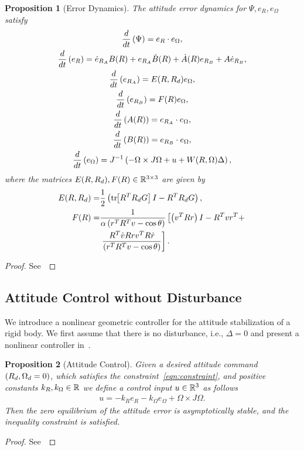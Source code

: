 \documentclass[fleqn]{IJCAS}  %
\newtheorem{prop}{Proposition}
\begin{document}
\begin{multicols}{2}
\begin{prop}[Error Dynamics]\label{prop:error_dyn}
	The attitude error dynamics for \( \Psi, e_R, e_\Omega \) satisfy 
	\begin{gather}
		\frac{d }{d t} \left( \Psi \right) = e_R \cdot e_\Omega , \label{eqn:psi_dot}\\
		\frac{d }{d t} \left( e_R \right) = \dot{e}_{R_A} B(R) + e_{R_A} \dot{B}(R) + \dot{A}(R)e_{R_B} + A \dot{e}_{R_B} , \label{eqn:eR_dot}\\
		\frac{d }{d t} \left( e_{R_A} \right) = E(R, R_d) e_\Omega , \label{eqn:eRA_dot} \\
		\frac{d }{d t} \left( e_{R_B} \right) = F(R) e_\Omega , \label{eqn:eRB_dot} \\
		\frac{d }{d t} \left( A(R) \right) = e_{R_A} \cdot e_\Omega , \label{eqn:A_dot} \\
		\frac{d }{d t} \left( B(R) \right) = e_{R_B} \cdot e_\Omega , \label{eqn:B_dot} \\
		\frac{d }{d t} \left( e_\Omega \right) = J^{-1} \left( -\Omega \times J \Omega + u + W(R, \Omega) \Delta \right) , \label{eqn:eW_dot}
	\end{gather}
	where the matrices \(E(R,R_d), F(R) \in \mathbb{R}^{3\times3} \) are given by
	\begin{align}
		E(R,R_d) = &\frac{1}{2} \left( \mathrm{tr}\negthickspace\left[ R^T R_d G \right]I - R^T R_d G \right) , \label{eqn:E} \\
		F(R) = &\frac{1}{\alpha \left( r^T R^T v - \cos \theta \right)} \left[\left( v^T R r \right) I - R^T v r^T + \right. \nonumber \\
		& \left. \frac{R^T \hat{v} R r v^T R \hat{r}}{\left( r^T R^T v - \cos \theta \right)}\right] . \label{eqn:F}
	\end{align}
\end{prop}
\begin{proof}
See~
\end{proof}

\subsection{Attitude Control without Disturbance}
We introduce a nonlinear geometric controller for the attitude stabilization of a rigid body.
We first assume that there is no disturbance, i.e., \( \Delta = 0 \) and present a nonlinear controller in~.
\begin{prop}[Attitude Control]\label{prop:att_control}
	Given a desired attitude command \( \left( R_d, \Omega_d = 0 \right) \), which satisfies the constraint~\cref{eqn:constraint}, and positive constants \( k_R, k_\Omega \in \mathbb{R} \) we define a control input \( u \in \mathbb{R}^3 \) as follows
	\begin{gather}
		u = -k_R e_R - k_\Omega e_\Omega + \Omega \times J \Omega . \label{eqn:nodist_control}
	\end{gather}
	Then the zero equilibrium of the attitude error is asymptotically stable, and the inequality constraint is satisfied.
\end{prop}
\begin{proof}
See~
\end{proof}


\end{multicols}
\end{document}
